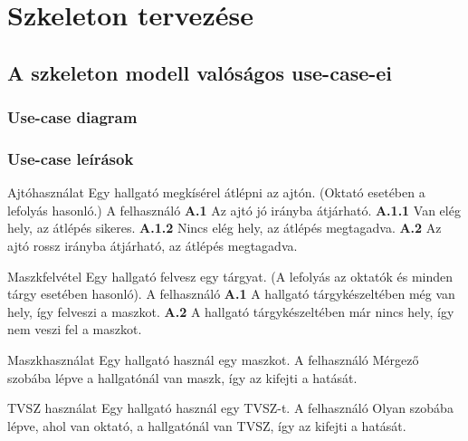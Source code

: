 \chapter{Szkeleton tervezése}


\section{A szkeleton modell valóságos use-case-ei}
\subsection{Use-case diagram}
\clearpage
\subsection{Use-case leírások}
\begin{use-case}
    {Ajtóhasználat}
    {Egy hallgató megkísérel átlépni az ajtón. (Oktató esetében a lefolyás hasonló.)}
    {A felhasználó}
    \textbf{A.1} Az ajtó jó irányba átjárható.
    \newline\textbf{A.1.1} Van elég hely, az átlépés sikeres.
    \newline\textbf{A.1.2} Nincs elég hely, az átlépés megtagadva.
    \newline\textbf{A.2} Az ajtó rossz irányba átjárható, az átlépés megtagadva.
\end{use-case}

\begin{use-case}
    {Maszkfelvétel}
    {Egy hallgató felvesz egy tárgyat. (A lefolyás az oktatók és minden tárgy esetében hasonló).}
    {A felhasználó}
    \textbf{A.1} A hallgató tárgykészeltében még van hely, így felveszi a maszkot. \newline
    \textbf{A.2} A hallgató tárgykészeltében már nincs hely, így nem veszi fel a maszkot.    
\end{use-case}

\begin{use-case}
    {Maszkhasználat}
    {Egy hallgató használ egy maszkot.}
    {A felhasználó}
    Mérgező szobába lépve a hallgatónál van maszk, így az kifejti a hatását.    
\end{use-case}

\begin{use-case}
    {TVSZ használat}
    {Egy hallgató használ egy TVSZ-t.}
    {A felhasználó}
    Olyan szobába lépve, ahol van oktató, a hallgatónál van TVSZ, így az kifejti a hatását.    
\end{use-case}

